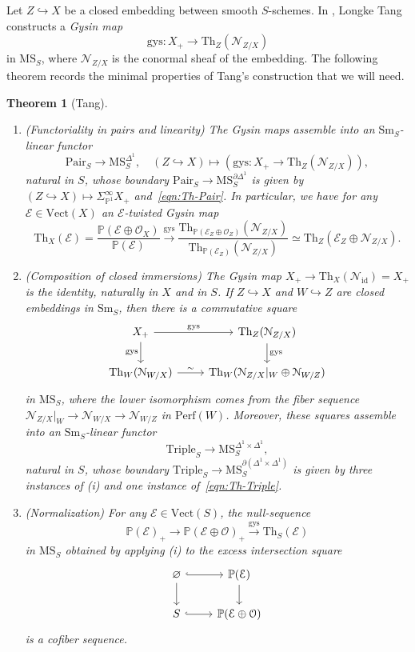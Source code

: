 \documentclass{amsart}
\numberwithin{equation}{section}
\theoremstyle{plain}
\newtheorem{theorem}[equation]{Theorem}
\theoremstyle{definition}
\let\scr=\mathcal
\let\bb=\mathbb
\def\P{\bb P}
\let\into=\hookrightarrow
\let\emptyset=\varnothing
\def\id{\mathrm{id}}
\def\Th{\mathrm{Th}}
\let\cat=\mathrm
\def\Sm{{\cat{S}\mathrm{m}}}
\def\Vect{\cat{V}\mathrm{ect}{}}
\def\Pair{\mathrm{Pair}}
\def\MS{\mathrm{MS}}
\def\Perf{\mathrm{Perf}{}}
\def\gys{\mathrm{gys}{}}
\begin{document}
Let $Z \into X$ be a closed embedding between smooth $S$-schemes. In \cite{Tang}, Longke Tang constructs a \emph{Gysin map}
\begin{equation*}
\gys\colon X_+ \to \Th_{Z}(\scr N_{Z/X})
\end{equation*}
in $\MS_S$, where $\scr N_{Z/X}$ is the conormal sheaf of the embedding. The following theorem records the minimal properties of Tang's construction that we will need.

\begin{theorem}[Tang]
\label{thm:tang}
\leavevmode
\begin{enumerate}
\item \textnormal{(Functoriality in pairs and linearity)} The Gysin maps assemble into an $\Sm_S$-linear functor
\[
\Pair_S \to \MS_S^{\Delta^1},\quad (Z\into X)\mapsto (\gys\colon X_+\to\Th_Z(\scr N_{Z/X})),
\]
natural in $S$, whose boundary $\Pair_S\to \MS_S^{\partial\Delta^1}$ is given by $(Z\into X)\mapsto \Sigma^\infty_{\P^1}X_+$ and~\eqref{eqn:Th-Pair}.
In particular, we have for any $\scr E\in\Vect(X)$ an $\scr E$-twisted Gysin map
\[
\Th_X(\scr E) =\frac{\P(\scr E\oplus\scr O_X)}{\P(\scr E)}\xrightarrow{\gys}\frac{\Th_{\P(\scr E_Z\oplus\scr O_Z)}(\scr N_{Z/X})}{\Th_{\P(\scr E_Z)}(\scr N_{Z/X})}\simeq \Th_Z(\scr E_Z\oplus\scr N_{Z/X}).
\]

\item \textnormal{(Composition of closed immersions)} 
The Gysin map $X_+\to\Th_X(\scr N_{\id})=X_+$ is the identity, naturally in $X$ and in $S$. If $Z \into X$ and $W \into Z$ are closed embeddings in $\Sm_S$, then there is a commutative square
\[
\begin{tikzcd}
	X_+ \ar{r}{\mathrm{gys}} \ar{d}[swap]{\mathrm{gys}} & \Th_{Z}(\scr N_{Z/X}) \ar{d}{\mathrm{gys}} \\
	 \Th_{W}(\scr N_{W/X}) \ar{r}{\sim} & \Th_{W}(\scr N_{Z/X}\vert_W \oplus \scr N_{W/Z} )
\end{tikzcd}
\]
in $\MS_S$, where the lower isomorphism comes from the fiber sequence $\scr N_{Z/X}\vert_W\to \scr N_{W/X}\to\scr N_{W/Z}$ in $\Perf(W)$.
Moreover, these squares assemble into an $\Sm_S$-linear functor
\[
\mathrm{Triple}_S\to \MS_S^{\Delta^1\times\Delta^1},
\]
natural in $S$,
whose boundary $\mathrm{Triple}_S\to \MS_S^{\partial(\Delta^1\times\Delta^1)}$ is given by three instances of \textnormal{(i)} and one instance of~\eqref{eqn:Th-Triple}.

\item \textnormal{(Normalization)} For any $\scr E\in\Vect(S)$, the null-sequence
\[
\P(\scr E)_+\to \P(\scr E \oplus \scr O)_+ \xrightarrow{\gys} \Th_S(\scr E)
\]
in $\MS_S$ obtained by applying \textnormal{(i)} to the excess intersection square
\[
\begin{tikzcd}
	\emptyset \ar[hook]{r}\ar{d} & \P(\scr E) \ar{d} \\
	S\ar[hook]{r} & \P(\scr E \oplus\scr O)
\end{tikzcd}
\]
is a cofiber sequence.
\end{enumerate}
\end{theorem}
\end{document}
